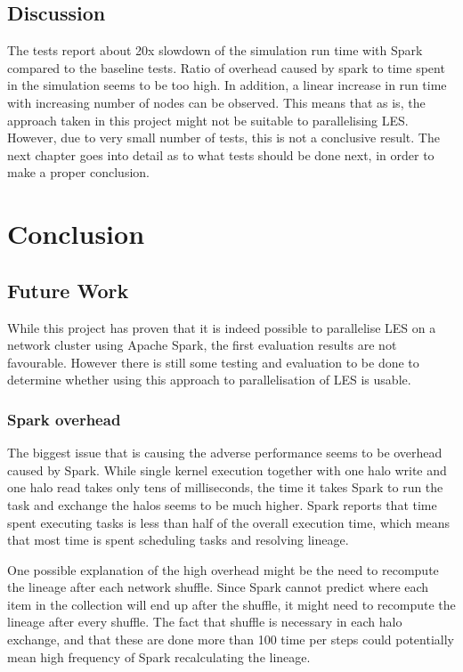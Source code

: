 \documentclass{l4proj}
\begin{document}
\section{Discussion}

The tests report about 20x slowdown of the simulation run time with Spark compared to
the baseline tests. Ratio of overhead caused by spark to time spent in the simulation
seems to be too high. In addition, a linear increase in run time with increasing number of nodes
can be observed. This means that as is, the approach taken in this project might not
be suitable to parallelising LES. However, due to very small number of tests, 
this is not a conclusive result. The next chapter goes into detail as to what tests
should be done next, in order to make a proper conclusion.

\chapter{Conclusion}
\label{chap:conclusion}

\section{Future Work}

While this project has proven that it is indeed possible to parallelise LES
on a network cluster using Apache Spark, the first evaluation results are
not favourable. However there is still some testing and evaluation to be done
to determine whether using this approach to parallelisation of LES is usable.

\subsection{Spark overhead}

The biggest issue that is causing the adverse performance seems to be overhead
caused by Spark. While single kernel execution together with one halo write and
one halo read takes only tens of milliseconds, the time it takes Spark
to run the task and exchange the halos seems to be much higher. Spark reports
that time spent executing tasks is less than half of the overall execution time, which means
that most time is spent scheduling tasks and resolving lineage.

One possible explanation of the high overhead might be the need to recompute the
lineage after each network shuffle. Since Spark cannot predict where each item
in the collection will end up after the shuffle, it might need to recompute the 
lineage after every shuffle. The fact that shuffle is necessary
in each halo exchange, and that these are done more than 100 time per steps could
potentially mean high frequency of Spark recalculating the lineage.
\end{document}
